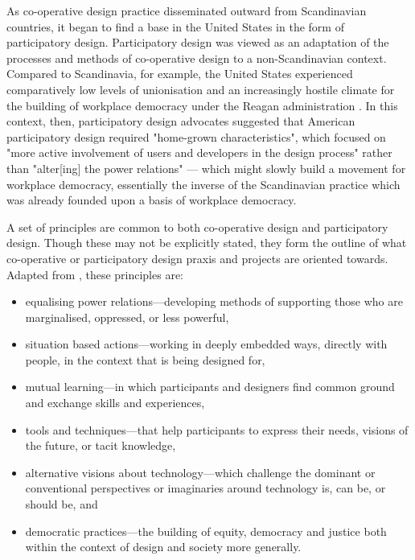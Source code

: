 As co-operative design practice disseminated outward from Scandinavian countries, it began to find a base in the United States in the form of participatory design. Participatory design was viewed as an adaptation of the processes and methods of co-operative design to a non-Scandinavian context. Compared to Scandinavia, for example, the United States experienced comparatively low levels of unionisation and an increasingly hostile climate for the building of workplace democracy under the Reagan administration \citep{greenbaum_design_1993}. In this context, then, participatory design advocates suggested that American participatory design required "home-grown characteristics", which focused on "more active involvement of users and developers in the design process" rather than "alter[ing] the power relations" \citeyearpar[p. 7]{greenbaum_design_1993}— which might slowly build a movement for workplace democracy, essentially the inverse of the Scandinavian practice which was already founded upon a basis of workplace democracy.

A set of principles are common to both co-operative design and participatory design. Though these may not be explicitly stated, they form the outline of what co-operative or participatory design praxis and projects are oriented towards. Adapted from \citet{greenbaum_participation_2012}, these principles are:
\begin{itemize}
\item equalising power relations—developing methods of supporting those who are marginalised, oppressed, or less powerful,
\item situation based actions—working in deeply embedded ways, directly with people, in the context that is being designed for,
\item mutual learning—in which participants and designers find common ground and exchange skills and experiences,
\item tools and techniques—that help participants to express their needs, visions of the future, or tacit knowledge,
\item alternative visions about technology—which challenge the dominant or conventional perspectives or imaginaries around technology is, can be, or should be, and
\item democratic practices—the building of equity, democracy and justice both within the context of design and society more generally.
\end{itemize}

